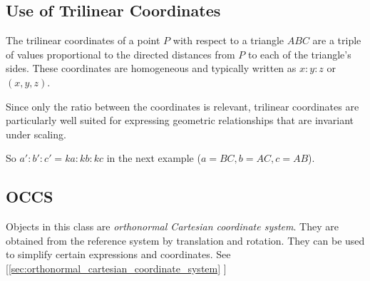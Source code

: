 \subsection{Use of Trilinear Coordinates}
\label{sub:use_of_trilinear_coordinates}

The trilinear coordinates of a point $P$ with respect to a triangle $ABC$ are a triple of values proportional to the directed distances from $P$ to each of the triangle’s sides. These coordinates are homogeneous and typically written as $x : y : z$ or $(x, y, z)$.

Since only the ratio between the coordinates is relevant, trilinear coordinates are particularly well suited for expressing geometric relationships that are invariant under scaling.

So $ a' : b' : c' = ka : kb : kc$ in the next example ($a = BC, b = AC, c = AB$).

\begin{minipage}{.5\textwidth}
\end{minipage}
\begin{minipage}{.5\textwidth}
\begin{tkzexample}
\end{tkzexample}
\end{minipage}

\subsection{OCCS}

Objects in this class are \emph{orthonormal Cartesian coordinate system}. They are obtained from the reference system by translation and rotation. They can be used to simplify certain expressions and coordinates.
See  [\ref{sec:orthonormal_cartesian_coordinate_system}
]
\endinput
